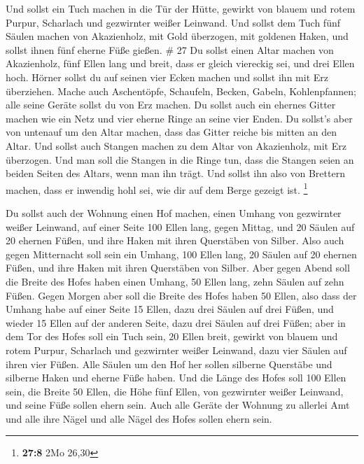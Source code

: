  Und sollst ein Tuch machen in die Tür der Hütte, gewirkt
von blauem und rotem Purpur, Scharlach und gezwirnter weißer Leinwand.
 Und sollst dem Tuch fünf Säulen machen von Akazienholz,
mit Gold überzogen, mit goldenen Haken, und sollst ihnen fünf eherne
Füße gießen. \# 27  Du sollst einen Altar machen von
Akazienholz, fünf Ellen lang und breit, dass er gleich viereckig sei,
und drei Ellen hoch.  Hörner sollst du auf seinen vier Ecken
machen und sollst ihn mit Erz überziehen.  Mache auch
Aschentöpfe, Schaufeln, Becken, Gabeln, Kohlenpfannen; alle seine Geräte
sollst du von Erz machen.  Du sollst auch ein ehernes Gitter
machen wie ein Netz und vier eherne Ringe an seine vier Enden.
 Du sollst's aber von untenauf um den Altar machen, dass das
Gitter reiche bis mitten an den Altar.  Und sollst auch
Stangen machen zu dem Altar von Akazienholz, mit Erz überzogen.
 Und man soll die Stangen in die Ringe tun, dass die Stangen
seien an beiden Seiten des Altars, wenn man ihn trägt.  Und
sollst ihn also von Brettern machen, dass er inwendig hohl sei, wie dir
auf dem Berge gezeigt ist. \footnote{\textbf{27:8} 2Mo 26,30}

 Du sollst auch der Wohnung einen Hof machen, einen Umhang
von gezwirnter weißer Leinwand, auf einer Seite 100 Ellen lang, gegen
Mittag,  und 20 Säulen auf 20 ehernen Füßen, und ihre Haken
mit ihren Querstäben von Silber.  Also auch gegen
Mitternacht soll sein ein Umhang, 100 Ellen lang, 20 Säulen auf 20
ehernen Füßen, und ihre Haken mit ihren Querstäben von Silber.
 Aber gegen Abend soll die Breite des Hofes haben einen
Umhang, 50 Ellen lang, zehn Säulen auf zehn Füßen.  Gegen
Morgen aber soll die Breite des Hofes haben 50 Ellen,  also
dass der Umhang habe auf einer Seite 15 Ellen, dazu drei Säulen auf drei
Füßen,  und wieder 15 Ellen auf der anderen Seite, dazu
drei Säulen auf drei Füßen;  aber in dem Tor des Hofes soll
ein Tuch sein, 20 Ellen breit, gewirkt von blauem und rotem Purpur,
Scharlach und gezwirnter weißer Leinwand, dazu vier Säulen auf ihren
vier Füßen.  Alle Säulen um den Hof her sollen silberne
Querstäbe und silberne Haken und eherne Füße haben.  Und
die Länge des Hofes soll 100 Ellen sein, die Breite 50 Ellen, die Höhe
fünf Ellen, von gezwirnter weißer Leinwand, und seine Füße sollen ehern
sein.  Auch alle Geräte der Wohnung zu allerlei Amt und
alle ihre Nägel und alle Nägel des Hofes sollen ehern sein.

